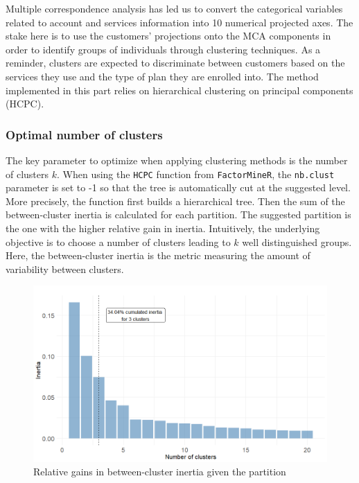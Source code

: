 \documentclass[
]{book}
\begin{document}
Multiple correspondence analysis has led us to convert the categorical variables related to account and services information into 10 numerical projected axes. The stake here is to use the customers' projections onto the MCA components in order to identify groups of individuals through clustering techniques. As a reminder, clusters are expected to discriminate between customers based on the services they use and the type of plan they are enrolled into. The method implemented in this part relies on hierarchical clustering on principal components (HCPC).

\hypertarget{optimal-number-of-clusters}{%
\subsubsection*{Optimal number of clusters}\label{optimal-number-of-clusters}}

The key parameter to optimize when applying clustering methods is the number of clusters \(k\). When using the \texttt{HCPC} function from \texttt{FactorMineR}, the \texttt{nb.clust} parameter is set to -1 so that the tree is automatically cut at the suggested level. More precisely, the function first builds a hierarchical tree. Then the sum of the between-cluster inertia is calculated for each partition. The suggested partition is the one with the higher relative gain in inertia. Intuitively, the underlying objective is to choose a number of clusters leading to \(k\) well distinguished groups. Here, the between-cluster inertia is the metric measuring the amount of variability between clusters.

\begin{figure}

{\centering \includegraphics[width=13.89in]{./imgs/btw_inertia} 

}

\caption{Relative gains in between-cluster inertia given the partition}\label{fig:btwinertia}
\end{figure}
\end{document}
